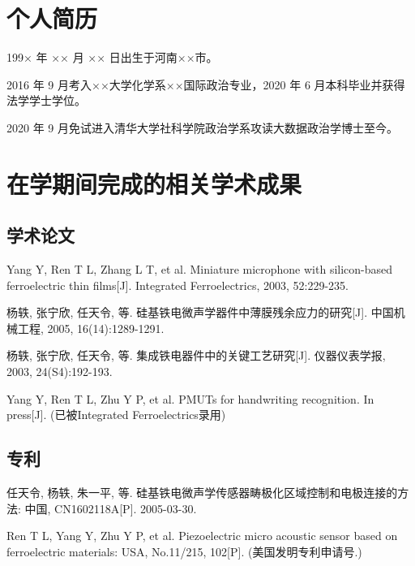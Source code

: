 
\begin{resume}

  \section*{个人简历}

  199× 年 ×× 月 ×× 日出生于河南××市。

  2016 年 9 月考入××大学化学系××国际政治专业，2020 年 6 月本科毕业并获得法学学士学位。

  2020 年 9 月免试进入清华大学社科学院政治学系攻读大数据政治学博士至今。


  \section*{在学期间完成的相关学术成果}

  \subsection*{学术论文}

  \begin{achievements}
    \item Yang Y, Ren T L, Zhang L T, et al. Miniature microphone with silicon-based ferroelectric thin films[J]. Integrated Ferroelectrics, 2003, 52:229-235.
    \item 杨轶, 张宁欣, 任天令, 等. 硅基铁电微声学器件中薄膜残余应力的研究[J]. 中国机械工程, 2005, 16(14):1289-1291.
    \item 杨轶, 张宁欣, 任天令, 等. 集成铁电器件中的关键工艺研究[J]. 仪器仪表学报, 2003, 24(S4):192-193.
    \item Yang Y, Ren T L, Zhu Y P, et al. PMUTs for handwriting recognition. In press[J]. (已被Integrated Ferroelectrics录用)
  \end{achievements}


  \subsection*{专利}

  \begin{achievements}
    \item 任天令, 杨轶, 朱一平, 等. 硅基铁电微声学传感器畴极化区域控制和电极连接的方法: 中国, CN1602118A[P]. 2005-03-30.
    \item Ren T L, Yang Y, Zhu Y P, et al. Piezoelectric micro acoustic sensor based on ferroelectric materials: USA, No.11/215, 102[P]. (美国发明专利申请号.)
  \end{achievements}

\end{resume}
